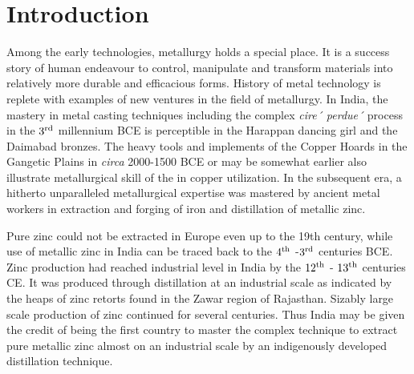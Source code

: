 \chapter{Introduction}\label{chapter1}





Among the early technologies, metallurgy holds a special place. It is a success story of human endeavour to control, manipulate and transform materials into relatively more durable and efficacious forms. History of metal technology is replete with examples of new ventures in the field of metallurgy. In India, the mastery in metal casting techniques including the complex \textit{cire´ perdue´} process in the $3^{\rm rd}$ millennium BCE is perceptible in the Harappan dancing girl and the Daimabad bronzes. The heavy tools and implements of the Copper Hoards in the Gangetic Plains in \textit{circa} 2000-1500 BCE or may be somewhat earlier also illustrate metallurgical skill of the in copper utilization. In the subsequent era, a hitherto unparalleled metallurgical expertise was mastered by ancient metal workers in extraction and forging of iron and distillation of metallic zinc. 

Pure zinc could not be extracted in Europe even up to the 19th century, while use of metallic zinc in India can be traced back to the $4^{\rm th}$ -$3^{\rm rd}$ centuries BCE. Zinc production had reached industrial level in India by the $12^{\rm th}$ - $13^{\rm th}$ centuries CE. It was produced through distillation at an industrial scale as indicated by the heaps of zinc retorts found in the Zawar region of Rajasthan. Sizably large scale production of zinc continued for several centuries. Thus India may be given the credit of being the first country to master the complex technique to extract pure metallic zinc almost on an industrial scale by an indigenously developed distillation technique.

